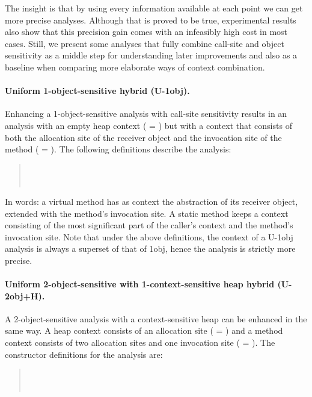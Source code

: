 The insight is that by using every information available at each point we can get more precise analyses. Although that is proved to be true, experimental results also show that this precision gain comes with an infeasibly high cost in most cases. Still, we present some analyses that fully combine call-site and object sensitivity as a middle step for understanding later improvements and also as a baseline when comparing more elaborate ways of context combination.

\paragraph{Uniform 1-object-sensitive hybrid (U-1obj).}
Enhancing a 1-object-sensitive analysis with call-site sensitivity results in an analysis with an empty heap context ( = \args{\{$\star$\}}) but with a context that consists of both the allocation site of the receiver object and the invocation site of the method ( = ). The following definitions describe the analysis:

\begin{quote}
 \\
 \\
\end{quote}

In words: a virtual method has as context the abstraction of its receiver object, extended with the method's invocation site.  A static method keeps a context consisting of the most significant part of the caller's context and the method's invocation site. Note that under the above definitions, the context of a U-1obj analysis is always a superset of that of 1obj, hence the analysis is strictly more precise.

\paragraph{Uniform 2-object-sensitive with 1-context-sensitive heap hybrid (U-2obj+H).}
A 2-object-sensitive analysis with a context-sensitive heap can be enhanced in the same way. A heap context consists of an allocation site ( = ) and a method context consists of two allocation sites and one invocation site ( = ).  The constructor definitions for the analysis are:

\begin{quote}
 \\
 \\
\end{quote}


